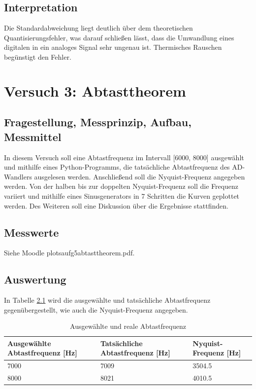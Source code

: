\documentclass[12pt, oneside, a4paper, \docLanguage]{report}
\begin{document}
\section{Interpretation}
\label{chap:VERSUCH_2_INTERPRETATION}
Die Standardabweichung liegt deutlich über dem theoretischen Quantisierungsfehler, was darauf schließen lässt, dass die Umwandlung eines digitalen in ein analoges Signal sehr ungenau ist. Thermisches Rauschen begünstigt den Fehler.

%
%
\chapter{Versuch 3: Abtasttheorem}
\label{chap:VERSUCH_3}

\section{Fragestellung, Messprinzip, Aufbau, Messmittel}
\label{chap:VERSUCH_3_FRAGESTELLUNG}
In diesem Versuch soll eine Abtastfrequenz im Intervall [6000, 8000] ausgewählt und mithilfe eines Python-Programms, die tatsächliche Abtastfrequenz des AD-Wandlers ausgelesen werden. Anschließend soll die Nyquist-Frequenz angegeben werden. Von der halben bis zur doppelten Nyquist-Frequenz soll die Frequenz variiert und mithilfe eines Sinusgenerators in 7 Schritten die Kurven geplottet werden. Des Weiteren soll eine Diskussion über die Ergebnisse stattfinden.

\section{Messwerte}
\label{chap:VERSUCH_3_MESSWERTE}
Siehe Moodle plots\textunderscore aufg5\textunderscore abtasttheorem.pdf.

\section{Auswertung}
\label{chap:VERSUCH_3_AUSWERTUNG}
In Tabelle \ref{fig:VERSUCH_3_auswertung} wird die ausgewählte und tatsächliche Abtastfrequenz gegenübergestellt, wie auch die Nyquist-Frequenz angegeben.

\begin{table}[H]
\centering
\begin{tabular}{|l|l|l|}
\hline
\textbf{Ausgewählte Abtastfrequenz {[}Hz{]}} & \textbf{Tatsächliche Abtastfrequenz {[}Hz{]}} & \textbf{Nyquist-Frequenz {[}Hz{]}} \\ \hline
7000                         & 7009                        & 3504.5                 \\ \hline
8000                         & 8021                        & 4010.5 \\ \hline
\end{tabular}
\caption{Ausgewählte und reale Abtastfrequenz}
\label{fig:VERSUCH_3_auswertung}
\end{table}                   
\end{document}

